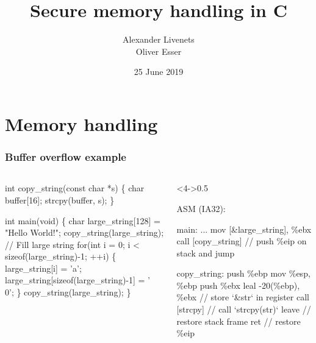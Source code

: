 \documentclass[usenames,dvipsnames]{beamer}
\title{Secure memory handling in C}
\subtitle{}
\author{Alexander Livenets \\ Oliver Esser}
\institute{}
\date{25 June 2019}
\begin{document}


\begin{frame}
\titlepage
\end{frame}

\section{Memory handling}
\begin{frame}[fragile]
\frametitle{Buffer overflow example}
\tiny
\begin{columns}
\begin{column}{0.5\textwidth}
\begin{semiverbatim}
int copy\_string(const char *s) \{
  char buffer[16];
  strcpy(buffer, s);
\}

int main(void) \{
  char large\_string[128] = "Hello World!";
  \alert<2->{copy\_string(large\_string);} 
\color{black}
  // Fill large string
  for(int i = 0; i < sizeof(large\_string)-1; ++i) \{
    large\_string[i] = 'a';
    large\_string[sizeof(large\_string)-1] = '\\0';
  \}
  \alert<3->{copy\_string(large\_string);}  
\}
\end{semiverbatim}
\end{column}
\pause
\begin{column}<4->{0.5\textwidth}
\begin{semiverbatim}
ASM (IA32):
 
main:
  ...
  mov [&large_string], \%ebx
  call [copy_string] // push \%eip on stack and jump

copy_string:
  push \%ebp
  mov \%esp, \%ebp
  push \%ebx
  leal -20(\%ebp), \%ebx // store  `&str` in register
  call [strcpy] // call `strcpy(str)`
  leave // restore stack frame
  ret // restore \%eip

\end{semiverbatim}

\end{column}
\end{columns}
\end{frame}
\end{document}
